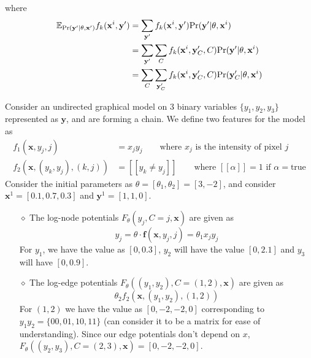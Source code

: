 where 
\begin{equation}
\begin{split}
	\mathbb{E}_{\text{Pr}(\mathbf y'| \theta, \mathbf x')} f_k(\mathbf x^i, \mathbf y') &= \sum_{\mathbf y'}  f_k(\mathbf x^i, \mathbf y')\text{Pr}(\mathbf y'|\theta, \mathbf x^i) \\
	&= \sum_{\mathbf y'} \sum_C f_k(\mathbf x^i, \mathbf y'_C, C)\text{Pr}(\mathbf y'|\theta, \mathbf x^i) \\
	&= \sum_C \sum_{\mathbf y_C'} f_k (\mathbf x^i, \mathbf y_C', C)\text{Pr}(\mathbf y_C'|\theta, \mathbf x^i)
\end{split}
\end{equation}
\begin{exmp}\label{exmp:i-1}
Consider an undirected graphical model on 3 binary variables $\{y_1, y_2, y_3\}$ represented as $\mathbf y$, and are forming a chain. We define two features for the model as
\[
\begin{split}
	f_1(\mathbf x, y_j, j) &= x_jy_j \qquad \text{where $x_j$ is the intensity of pixel $j$} \\
	f_2(\mathbf x, (y_k, y_j), (k,j)) &= [\![ y_k \neq y_j ]\!] \qquad \text{where $[\![\alpha]\!] = 1$ if $\alpha=$true}
\end{split}
\]
Consider the initial parameters as $\theta = [\theta_1, \theta_2] = [3,-2]$, and consider $\mathbf x^1 = [0.1, 0.7, 0.3]$ and $\mathbf y^1 = [1, 1, 0]$. \\
\begin{itemize}
	\item[$\diamond$] The log-node potentials $F_\theta(y_j, C=j, \mathbf x)$ are given as $$y_j = \theta \cdot \mathbf f(\mathbf x, y_j, j) = \theta_1 x_j y_j$$
	For $y_1$, we have the value as $[0, 0.3]$, $y_2$ will have the value $[0, 2.1]$ and $y_3$ will have $[0, 0.9]$.
	\item[$\diamond$] The log-edge potentials $F_\theta((y_1, y_2), C=(1,2), \mathbf x)$ are given as
	\[\theta_2f_2(\mathbf x, (y_1, y_2), (1,2))\]
	For $(1,2)$ we have the value as $[0, -2, -2, 0]$ corresponding to $y_1y_2 = \{00, 01, 10, 11\}$ (can consider it to be a matrix for ease of understanding). Since our edge potentials don't depend on $x$, $F_\theta((y_2,y_3), C=(2,3), \mathbf x) = [0, -2, -2, 0]$. 
\end{itemize}
\end{exmp}
